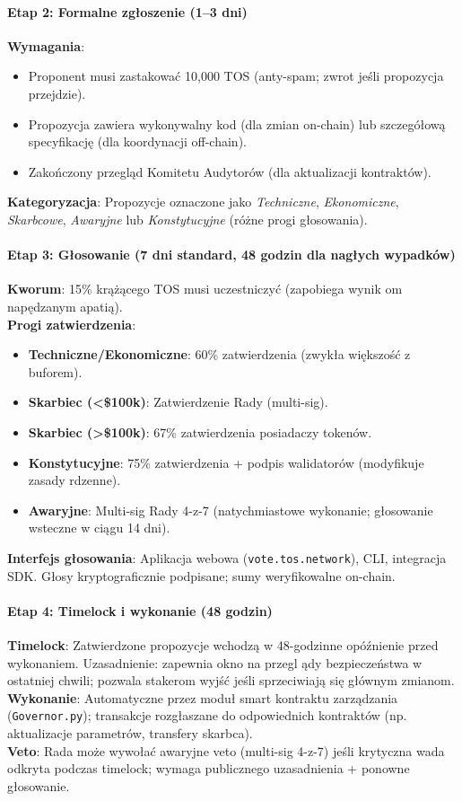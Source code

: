 \documentclass[11pt]{article}
\begin{document}
\paragraph{Etap 2: Formalne zgłoszenie (1--3 dni)}
\textbf{Wymagania}:
\begin{itemize}[noitemsep]
  \item Proponent musi zastakować 10,000 TOS (anty-spam; zwrot jeśli propozycja przejdzie).
  \item Propozycja zawiera wykonywalny kod (dla zmian on-chain) lub szczegółową specyfikację (dla koordynacji off-chain).
  \item Zakończony przegląd Komitetu Audytorów (dla aktualizacji kontraktów).
\end{itemize}
\textbf{Kategoryzacja}: Propozycje oznaczone jako \emph{Techniczne}, \emph{Ekonomiczne}, \emph{Skarbcowe}, \emph{Awaryjne} lub \emph{Konstytucyjne} (różne progi głosowania).

\paragraph{Etap 3: Głosowanie (7 dni standard, 48 godzin dla nagłych wypadków)}
\textbf{Kworum}: 15\% krążącego TOS musi uczestniczyć (zapobiega wynik om napędzanym apatią).\\
\textbf{Progi zatwierdzenia}:
\begin{itemize}[noitemsep]
  \item \textbf{Techniczne/Ekonomiczne}: 60\% zatwierdzenia (zwykła większość z buforem).
  \item \textbf{Skarbiec (<\$100k)}: Zatwierdzenie Rady (multi-sig).
  \item \textbf{Skarbiec (>\$100k)}: 67\% zatwierdzenia posiadaczy tokenów.
  \item \textbf{Konstytucyjne}: 75\% zatwierdzenia + podpis walidatorów (modyfikuje zasady rdzenne).
  \item \textbf{Awaryjne}: Multi-sig Rady 4-z-7 (natychmiastowe wykonanie; głosowanie wsteczne w ciągu 14 dni).
\end{itemize}
\textbf{Interfejs głosowania}: Aplikacja webowa (\texttt{vote.tos.network}), CLI, integracja SDK. Głosy kryptograficznie podpisane; sumy weryfikowalne on-chain.

\paragraph{Etap 4: Timelock i wykonanie (48 godzin)}
\textbf{Timelock}: Zatwierdzone propozycje wchodzą w 48-godzinne opóźnienie przed wykonaniem. Uzasadnienie: zapewnia okno na przegl ądy bezpieczeństwa w ostatniej chwili; pozwala stakerom wyjść jeśli sprzeciwiają się głównym zmianom.\\
\textbf{Wykonanie}: Automatyczne przez moduł smart kontraktu zarządzania (\texttt{Governor.py}); transakcje rozgłaszane do odpowiednich kontraktów (np. aktualizacje parametrów, transfery skarbca).\\
\textbf{Veto}: Rada może wywołać awaryjne veto (multi-sig 4-z-7) jeśli krytyczna wada odkryta podczas timelock; wymaga publicznego uzasadnienia + ponowne głosowanie.
\end{document}
